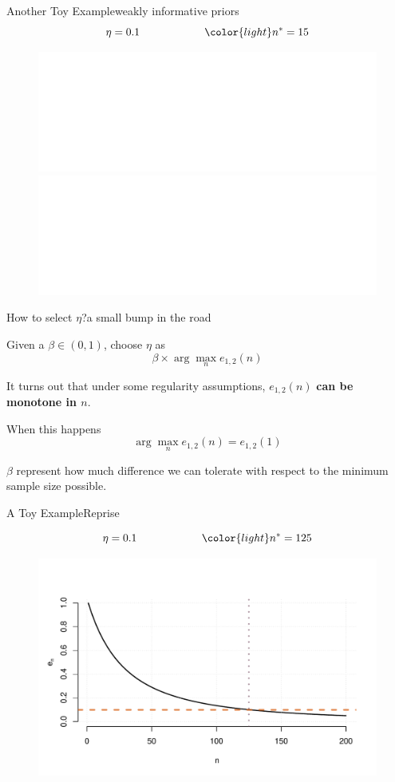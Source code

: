 \documentclass[9 pt]{beamer}
\begin{document}
\begin{frame}{Another Toy Example}{weakly informative priors}
\[\eta = 0.1 \qquad\qquad\qquad {\color{light}n^*} = 15\]
\begin{figure}
    \centering
    \includegraphics<1>[width = 1\textwidth]{images/plot_PEC21.pdf}
    \includegraphics<2>[width = 1\textwidth]{images/plot_PEC22.pdf}
\end{figure}
    
\end{frame}


\begin{frame}{How to select $\eta$?}{a small bump in the road}

\begin{exampleblock}

Given a $\beta \in (0,1)$, choose $\eta$ as $$\beta \times \arg\max_n  e_{1,2} (n) $$
\end{exampleblock}

\vspace{0.25cm}

\pause 
It turns out that under some regularity assumptions, $ e_{1,2} (n) $ \textcolor{light}{\bf can be monotone in $n$}. 

\vspace{0.25cm}
\pause 

When this happens 
$$\arg\max_n e_{1,2} (n) =  e_{1,2}(1)$$

$\beta$ represent how much difference we can tolerate with respect to the minimum sample size possible. 

\end{frame}


\begin{frame}{A Toy Example}{Reprise}
    
    \[\eta = 0.1 \qquad\qquad\qquad {\color{light}n^*} = 125\]
\begin{figure}
    \centering
    \includegraphics[width = 1\textwidth]{images/plot_PEC12.pdf}
\end{figure}
    
    
\end{frame}
\end{document}
